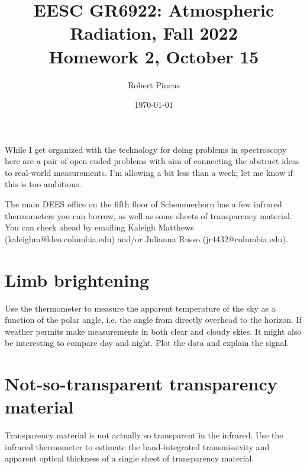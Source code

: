 \documentclass{article}
\title{EESC GR6922: Atmospheric Radiation, Fall 2022 \\ Homework 2, October 15}
\author{Robert Pincus}
\date{\today}
\begin{document}
\maketitle
While I get organized with the technology for doing problems in spectroscopy here are a pair of open-ended problems with aim of connecting the abstract ideas to real-world measurements. I'm allowing a bit less than a week; let me know if this is too ambitious. 

The main DEES office on the fifth floor of Schemmerhorn has a few infrared thermometers you can borrow, as well as some sheets of transparency material. You can check ahead by emailing Kaleigh Matthews (kaleighm@ldeo.columbia.edu) and/or  Julianna Russo (jr4432@columbia.edu). 

\section{Limb brightening}

Use the thermometer to measure the apparent temperature of the sky as a function of the polar angle, i.e. the angle from directly overhead to the horizon. If weather permits make measurements in both clear and cloudy skies. It might also be interesting to compare day and night. Plot the data and explain the signal. 

\section{Not-so-transparent transparency material} 
Transparency material is not actually so transparent in the infrared. Use the infrared thermometer to estimate the band-integrated transmissivity and apparent optical thickness of a single sheet of transparency material.  
\end{document}
